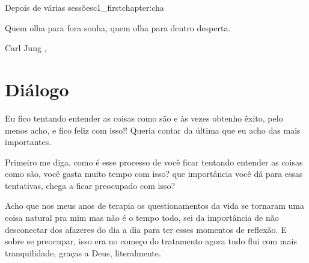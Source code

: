 


\begin{chapterpage}{Depois de várias sessões}{c1_firstchapter:cha}

\begin{myquotation} Quem olha para fora sonha, quem olha para dentro desperta.
\par\vspace*{15mm}
\mbox{}\hfill \emdash{}Carl Jung 
, %
\par\end{myquotation}

\end{chapterpage}



\section{Diálogo}\label{c1_basicformatting:sec}

\emdash{}Eu fico tentando entender as coisas como são e às vezes obtenho êxito, pelo menos acho, e fico feliz com isso!! Queria contar da última que eu acho das mais importantes.

\emdash{}Primeiro me diga, como é esse processo de você ficar tentando entender as coisas como são, você gasta muito tempo com isso? que importância você dá para essas tentativas, chega a ficar preocupado com isso?

\emdash{}Acho que nos meus anos de terapia os questionamentos da vida se tornaram uma coisa natural pra mim mas não é o tempo todo, sei da importância de não desconectar dos afazeres do dia a dia para ter esses momentos de reflexão. E sobre se preocupar, isso era no começo do tratamento agora tudo flui com mais tranquilidade, graças a Deus, literalmente.


